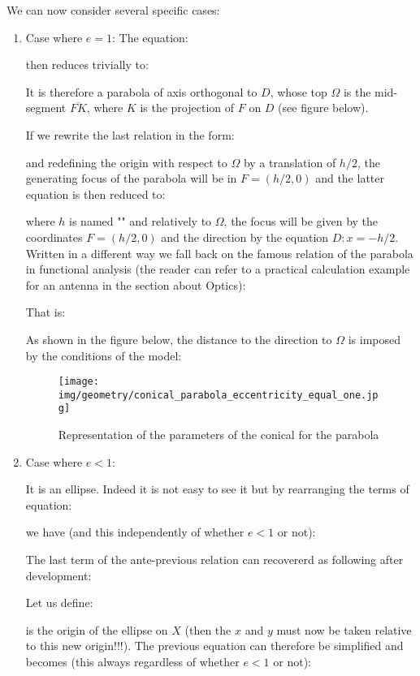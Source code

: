 	We can now consider several specific cases:
	\begin{enumerate}
		\item Case where $e=1$:
		The equation:
		
		then reduces trivially to:
		
		It is therefore a parabola of axis orthogonal to $D$, whose top $\Omega$ is the mid-segment $\overline{FK}$, where $K$ is the projection of $F$ on $D$ (see figure below).
		
		If we rewrite the last relation in the form:
		
		and redefining the origin with respect to $\Omega$ by a translation of $h/2$, the generating focus of the parabola will be in $F=(h/2,0)$ and the latter equation is then reduced to:
		
		where $h$ is named "" and relatively to $\Omega$, the focus will be given by the coordinates $F=(h/2,0)$ and the direction by the equation $D:x=-h/2$. Written in a different way we fall back on the famous relation of the parabola in functional analysis (the reader can refer to a practical calculation example for an antenna in the section about Optics):
		
		That is:
		
		As shown in the figure below, the distance to the direction to $\Omega$ is imposed by the conditions of the model:
		\begin{figure}[H]
			\centering
			\texttt{[image: img/geometry/conical\_parabola\_eccentricity\_equal\_one.jpg]}
			\caption{Representation of the parameters of the conical for the parabola}
		\end{figure}
	
		\item Case where $e<1$:
		
		It is an ellipse. Indeed it is not easy to see it but by rearranging the terms of equation:
		
		we have (and this independently of whether $e<1$ or not):
		
		The last term of the ante-previous relation can recovererd as following after development:
		
		Let us define:
		
		is the origin of the ellipse on $X$ (then the $x$ and $y$ must now be taken relative to this new origin!!!). The previous equation can therefore be simplified and becomes (this always regardless of whether $e<1$ or not):
		

\end{enumerate}
